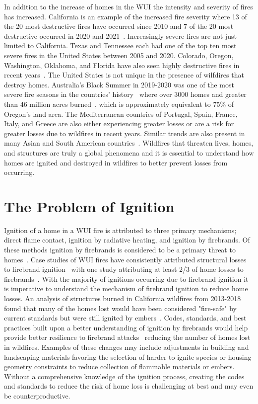     In addition to the increase of homes in the WUI the intensity and severity of fires has increased. California is an example of the increased fire severity where 13 of the 20 most destructive fires have occurred since 2010 and 7 of the 20 most destructive occurred in 2020 and 2021~\cite{CALFIRE2018}. Increasingly severe fires are not just limited to California. Texas and Tennessee each had one of the top ten most severe fires in the United States between 2005 and 2020. Colorado, Oregon, Washington, Oklahoma, and Florida have also seen highly destructive fires in recent years~\cite{Barrett2020}. The United States is not unique in the presence of wilfdires that destroy homes. Australia's Black Summer in 2019-2020 was one of the most severe fire seasons in the countries' history~\cite{Levin2021Unveiling2019/2020} where over 3000 homes and greater than 46 million acres burned~\cite{Filkov2020ImpactTrends}, which is approximately equivalent to 75\% of Oregon's land area. The Mediterranean countries of Portugal, Spain, France, Italy, and Greece are also either experiencing greater losses or are a risk for greater losses due to wildfires in recent years. Similar trends are also present in many Asian and South American countries~\cite{Manzello2018}. Wildfires that threaten lives, homes, and structures are truly a global phenomena and it is essential to understand how homes are ignited and destroyed in wildfires to better prevent losses from occurring.

\section{The Problem of Ignition}
    Ignition of a home in a WUI fire is attributed to three primary mechanisms; direct flame contact, ignition by radiative heating, and ignition by firebrands. Of these methods ignition by firebrands is considered to be a primary threat to homes~\cite{Suzuki2021, Mell2010, Manzello2018FORUMResearch}. Case studies of WUI fires have consistently attributed structural losses to firebrand ignition~\cite{Westhaver2017WhyDisaster, Roberts2021} with one study attributing at least 2/3 of home losses to firebrands~\cite{Mell2011}. With the majority of ignitions occurring due to firebrand ignition it is imperative to understand the mechanism of firebrand ignition to reduce home losses. An analysis of structures burned in California wildfires from 2013-2018 found that many of the homes lost would have been considered "fire-safe" by current standards but were still ignited by embers~\cite{Syphard2019}. Codes, standards, and best practices built upon a better understanding of ignition by firebrands would help provide better resilience to firebrand attacks~\cite{Manzello2020} reducing the number of homes lost in wildfires.  Examples of these changes may include adjustments in building and landscaping materials favoring the selection of harder to ignite species or housing geometry constraints to reduce collection of flammable materials or embers. Without a comprehensive knowledge of the ignition process, creating the codes and standards to reduce the risk of home loss is challenging at best and may even be counterproductive.  
    
